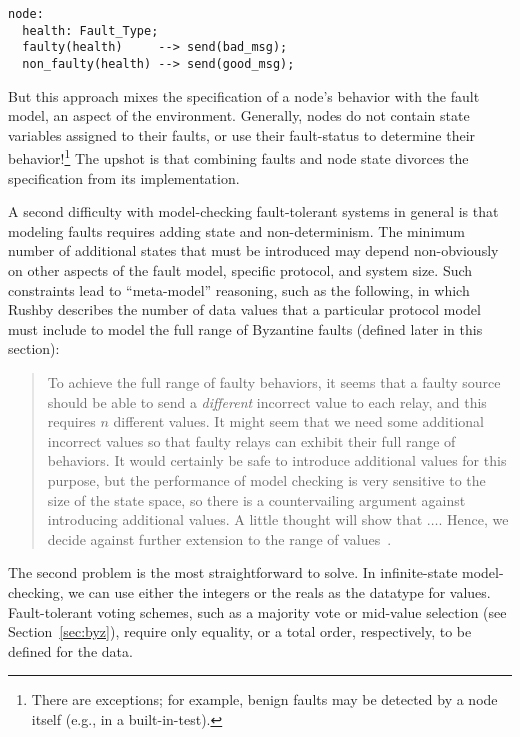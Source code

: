 \documentclass{llncs/llncs}
\begin{document}
\small
\begin{verbatim}
node:
  health: Fault_Type;
  faulty(health)     --> send(bad_msg);
  non_faulty(health) --> send(good_msg);
\end{verbatim}
\normalsize


\noindent
But this approach mixes the specification of a node's behavior with the fault model, an aspect of the environment. Generally, nodes do not contain state variables assigned to their faults, or use their fault-status to determine their behavior!\footnote{There are exceptions; for example, benign faults may be detected by a node itself (e.g., in a built-in-test).} The upshot is that combining faults and node state divorces the specification from its implementation.

A second difficulty with model-checking fault-tolerant systems in general is that modeling faults requires adding state and non-determinism. The minimum number of additional states that must be introduced may depend non-obviously on other aspects of the fault model, specific protocol, and system size. Such constraints lead to ``meta-model'' reasoning, such as the following, in which Rushby describes the number of data values that a particular protocol model must include to model the full range of Byzantine faults (defined later in this section):

\begin{quote}
To achieve the full range of faulty behaviors, it seems that a faulty source should be able to send a \emph{different} incorrect value to each relay, and this requires $n$ different values. It might seem that we need some additional incorrect values so that faulty relays can exhibit their full range of behaviors. It would certainly be safe to introduce additional values for this purpose, but the performance of model checking is very sensitive to the size of the state space, so there is a countervailing argument against introducing additional values. A little thought will show that $\ldots$. Hence, we decide against further extension to the range of values~\cite{Rushby:OM1}.
\end{quote}

The second problem is the most straightforward to solve. In infinite-state model-checking, we can use either the integers or the reals as the datatype for values. Fault-tolerant voting schemes, such as a majority vote or mid-value selection (see Section~\ref{sec:byz}), require only equality, or a total order, respectively, to be defined for the data.
\end{document}
